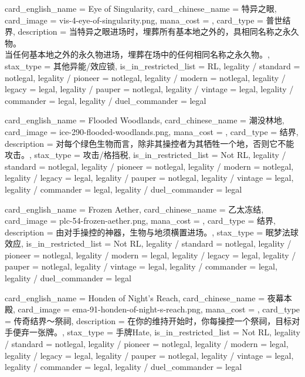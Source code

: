 \documentclass[lang = cn, color = black, 10pt]{AllThatStax}
\begin{document}
\card
{
	card_english_name = {Eye of Singularity},
	card_chinese_name = {特异之眼},
	card_image = vis-4-eye-of-singularity.png,
	mana_cost = ,
	card_type = 普世结界,
	description = {当特异之眼进场时，埋葬所有基本地之外的，具相同名称之永久物。\\
当任何基本地之外的永久物进场，埋葬在场中的任何相同名称之永久物。},
	stax_type = 其他异能/效应锁,
	is_in_restricted_list = RL,
	legality / standard = notlegal,
	legality / pioneer = notlegal,
	legality / modern = notlegal,
	legality / legacy = legal,
	legality / pauper = notlegal,
	legality / vintage = legal,
	legality / commander = legal,
	legality / duel_commander = legal
}

\card
{
	card_english_name = {Flooded Woodlands},
	card_chinese_name = {潮没林地},
	card_image = ice-290-flooded-woodlands.png,
	mana_cost = ,
	card_type = 结界,
	description = {对每个绿色生物而言，除非其操控者为其牺牲一个地，否则它不能攻击。},
	stax_type = 攻击/格挡税,
	is_in_restricted_list = Not RL,
	legality / standard = notlegal,
	legality / pioneer = notlegal,
	legality / modern = notlegal,
	legality / legacy = legal,
	legality / pauper = notlegal,
	legality / vintage = legal,
	legality / commander = legal,
	legality / duel_commander = legal
}

\card
{
	card_english_name = {Frozen Aether},
	card_chinese_name = {乙太冻结},
	card_image = plc-54-frozen-aether.png,
	mana_cost = ,
	card_type = 结界,
	description = {由对手操控的神器，生物与地须横置进场。},
	stax_type = 眠梦法球效应,
	is_in_restricted_list = Not RL,
	legality / standard = notlegal,
	legality / pioneer = notlegal,
	legality / modern = legal,
	legality / legacy = legal,
	legality / pauper = notlegal,
	legality / vintage = legal,
	legality / commander = legal,
	legality / duel_commander = legal
}

\card
{
	card_english_name = {Honden of Night's Reach},
	card_chinese_name = {夜幕本殿},
	card_image = ema-91-honden-of-night-s-reach.png,
	mana_cost = ,
	card_type = 传奇结界～祭祠,
	description = {在你的维持开始时，你每操控一个祭祠，目标对手便弃一张牌。},
	stax_type = 手牌Hate,
	is_in_restricted_list = Not RL,
	legality / standard = notlegal,
	legality / pioneer = notlegal,
	legality / modern = legal,
	legality / legacy = legal,
	legality / pauper = notlegal,
	legality / vintage = legal,
	legality / commander = legal,
	legality / duel_commander = legal
}
\end{document}
